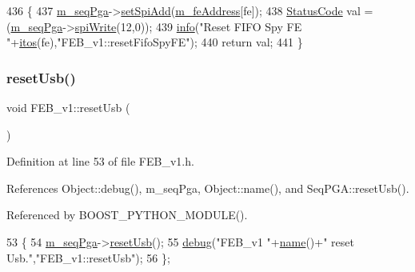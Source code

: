 \begin{DoxyCode}
436                                        \{  
437   \hyperlink{classFEB__v1_a6c7804ac86796f233a8393043adf2e77}{m\_seqPga}->\hyperlink{classSeqPGA_ac998ce3a6d9b5f2e88cc8393f8c1df53}{setSpiAdd}(\hyperlink{classFEB__v1_a4e1945c2d5b434125f375e9d0fc6d99f}{m\_feAddress}[fe]);
438   \hyperlink{classStatusCode}{StatusCode} val = (\hyperlink{classFEB__v1_a6c7804ac86796f233a8393043adf2e77}{m\_seqPga}->\hyperlink{classSeqPGA_ad4421841ce4ce8b88ad13f63216f0743}{spiWrite}(12,0));
439   \hyperlink{classObject_a644fd329ea4cb85f54fa6846484b84a8}{info}(\textcolor{stringliteral}{"Reset FIFO Spy FE "}+\hyperlink{Tools_8h_af330027dbdafb9a30768b3613c553e60}{itos}(fe),\textcolor{stringliteral}{"FEB\_v1::resetFifoSpyFE"});
440   \textcolor{keywordflow}{return} val;
441 \}
\end{DoxyCode}
\mbox{\label{classFEB__v1_aa545951bdeab3e1dd600336c313c7769}} 
\subsubsection{\texorpdfstring{reset\+Usb()}{resetUsb()}}
{\footnotesize\ttfamily void F\+E\+B\+\_\+v1\+::reset\+Usb (\begin{DoxyParamCaption}{ }\end{DoxyParamCaption})\hspace{0.3cm}{\ttfamily [inline]}}



Definition at line 53 of file F\+E\+B\+\_\+v1.\+h.



References Object\+::debug(), m\+\_\+seq\+Pga, Object\+::name(), and Seq\+P\+G\+A\+::reset\+Usb().



Referenced by B\+O\+O\+S\+T\+\_\+\+P\+Y\+T\+H\+O\+N\+\_\+\+M\+O\+D\+U\+L\+E().


\begin{DoxyCode}
53                   \{
54     \hyperlink{classFEB__v1_a6c7804ac86796f233a8393043adf2e77}{m\_seqPga}->\hyperlink{classSeqPGA_aea7d31e0cce81ea4dcad7d4534ff4493}{resetUsb}();
55     \hyperlink{classObject_aac010553f022165573714b7014a15f0d}{debug}(\textcolor{stringliteral}{"FEB\_v1 "}+\hyperlink{classObject_a300f4c05dd468c7bb8b3c968868443c1}{name}()+\textcolor{stringliteral}{" reset Usb."},\textcolor{stringliteral}{"FEB\_v1::resetUsb"});
56   \};
\end{DoxyCode}
\mbox{\label{classFEB__v1_a8bf655504f9b0c51d5aa5bc6b30da00d}} 
